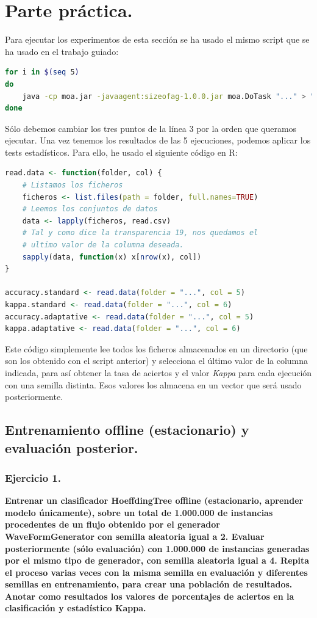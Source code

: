 \documentclass[11pt]{article}
\begin{document}
\section{Parte práctica.}

Para ejecutar los experimentos de esta sección se ha usado el mismo script que se ha usado en el trabajo guiado:

\begin{lstlisting}[language=bash]
for i in $(seq 5)
do
	java -cp moa.jar -javaagent:sizeofag-1.0.0.jar moa.DoTask "..." > "$i.txt"
done
\end{lstlisting}

Sólo debemos cambiar los tres puntos de la línea 3 por la orden que queramos ejecutar. Una vez tenemos los resultados de las 5 ejecuciones, podemos aplicar los tests estadísticos. Para ello, he usado el siguiente código en R:

\begin{lstlisting}[language=R]
read.data <- function(folder, col) {
	# Listamos los ficheros
	ficheros <- list.files(path = folder, full.names=TRUE)
	# Leemos los conjuntos de datos
	data <- lapply(ficheros, read.csv)
	# Tal y como dice la transparencia 19, nos quedamos el 
	# ultimo valor de la columna deseada.
	sapply(data, function(x) x[nrow(x), col])
}

accuracy.standard <- read.data(folder = "...", col = 5)
kappa.standard <- read.data(folder = "...", col = 6)
accuracy.adaptative <- read.data(folder = "...", col = 5)
kappa.adaptative <- read.data(folder = "...", col = 6)
\end{lstlisting}

Este código simplemente lee todos los ficheros almacenados en un directorio (que son los obtenido con el script anterior) y selecciona el último valor de la columna indicada, para así obtener la tasa de aciertos y el valor \textit{Kappa} para cada ejecución con una semilla distinta. Esos valores los almacena en un vector que será usado posteriormente.

\subsection{Entrenamiento offline (estacionario) y evaluación posterior.}

\subsubsection{Ejercicio 1.}

\textbf{Entrenar un clasificador HoeffdingTree offline (estacionario, aprender modelo únicamente), sobre un total de 1.000.000 de instancias procedentes de un flujo obtenido por el generador WaveFormGenerator con semilla aleatoria igual a 2. Evaluar posteriormente (sólo evaluación) con 1.000.000 de instancias generadas por el mismo tipo de generador, con semilla aleatoria igual a 4. Repita el proceso varias veces con la misma semilla en evaluación y diferentes semillas en entrenamiento, para crear una población de resultados. Anotar como resultados los valores de porcentajes de aciertos en la clasificación y estadístico Kappa.} \\
\end{document}
